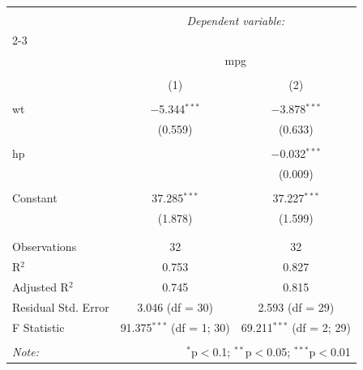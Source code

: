 
\begin{table}[!htbp] \centering
  \caption{}
  \label{}
\begin{tabular}{@{\extracolsep{5pt}}lcc}
\\[-1.8ex]\hline
\hline \\[-1.8ex]
 & \multicolumn{2}{c}{\textit{Dependent variable:}} \\
\cline{2-3}
\\[-1.8ex] & \multicolumn{2}{c}{mpg} \\
\\[-1.8ex] & (1) & (2)\\
\hline \\[-1.8ex]
 wt & $-$5.344$^{***}$ & $-$3.878$^{***}$ \\
  & (0.559) & (0.633) \\
  & & \\
 hp &  & $-$0.032$^{***}$ \\
  &  & (0.009) \\
  & & \\
 Constant & 37.285$^{***}$ & 37.227$^{***}$ \\
  & (1.878) & (1.599) \\
  & & \\
\hline \\[-1.8ex]
Observations & 32 & 32 \\
R$^{2}$ & 0.753 & 0.827 \\
Adjusted R$^{2}$ & 0.745 & 0.815 \\
Residual Std. Error & 3.046 (df = 30) & 2.593 (df = 29) \\
F Statistic & 91.375$^{***}$ (df = 1; 30) & 69.211$^{***}$ (df = 2; 29) \\
\hline
\hline \\[-1.8ex]
\textit{Note:}  & \multicolumn{2}{r}{$^{*}$p$<$0.1; $^{**}$p$<$0.05; $^{***}$p$<$0.01} \\
\end{tabular}
\end{table}
